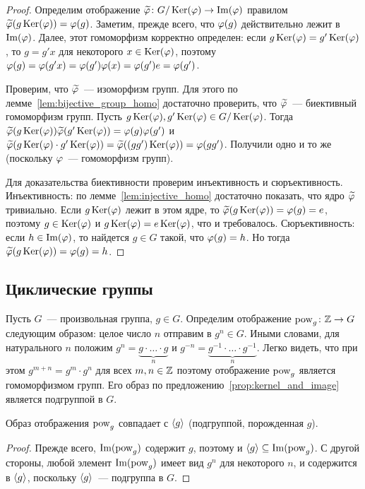 \begin{proof}
Определим отображение $\widetilde{\varphi}\colon G/\operatorname{Ker}(\varphi)\to\operatorname{Im}(\varphi)$
правилом $\widetilde{\varphi}(g\operatorname{Ker}(\varphi)) = \varphi(g)$. Заметим, прежде всего,
что $\varphi(g)$ действительно лежит в $\operatorname{Im}(\varphi)$. Далее, этот
гомоморфизм корректно определен: если $g\operatorname{Ker}(\varphi) = g'\operatorname{Ker}(\varphi)$, то
$g = g'x$ для некоторого $x\in\operatorname{Ker}(\varphi)$, поэтому
$\varphi(g) = \varphi(g'x) = \varphi(g')\varphi(x) = \varphi(g')e = \varphi(g')$.

Проверим, что $\widetilde{\varphi}$~--- изоморфизм групп. Для этого по
лемме~\ref{lem:bijective_group_homo} достаточно проверить, что
$\widetilde{\varphi}$~--- биективный гомоморфизм групп. Пусть
$g\operatorname{Ker}(\varphi), g'\operatorname{Ker}(\varphi)\in G/\operatorname{Ker}(\varphi)$.
Тогда $\widetilde{\varphi}(g\operatorname{Ker}(\varphi))\widetilde{\varphi}(g'\operatorname{Ker}(\varphi)) =
\varphi(g)\varphi(g')$ и $\widetilde{\varphi}(g\operatorname{Ker}(\varphi)\cdot g'\operatorname{Ker}(\varphi)) =
\widetilde{\varphi}((gg')\operatorname{Ker}(\varphi)) = \varphi(gg')$. Получили одно и то же
(поскольку $\varphi$~--- гомоморфизм групп).

Для доказательства биективности проверим инъективность и
сюръективность. Инъективность: по лемме~\ref{lem:injective_homo}
достаточно показать, что ядро $\widetilde{\varphi}$ тривиально. Если
$g\operatorname{Ker}(\varphi)$ лежит в этом ядре, то $\widetilde{\varphi}(g\operatorname{Ker}(\varphi)) = \varphi(g)
= e$, поэтому $g\in\operatorname{Ker}(\varphi)$ и $g\operatorname{Ker}(\varphi) = e\operatorname{Ker}(\varphi)$, что и
требовалось. Сюръективность: если $h\in\operatorname{Im}(\varphi)$, то найдется $g\in
G$ такой, что $\varphi(g) = h$. Но тогда $\widetilde{\varphi}(g\operatorname{Ker}(\varphi)) =
\varphi(g) = h$.
\end{proof}

\subsection{Циклические группы}


Пусть $G$~--- произвольная группа, $g\in G$. Определим отображение
$\operatorname{pow}_g\colon\mathbb Z\to G$ следующим образом: целое число $n$ отправим в
$g^n\in
G$. Иными словами, для натурального $n$ положим
$g^n = \underbrace{g\cdot\dots\cdot g}_n$ и
$g^{-n} = \underbrace{g^{-1}\cdot\dots\cdot g^{-1}}_n$. Легко видеть,
что при этом $g^{m+n} = g^m\cdot g^n$ для всех $m,n\in\mathbb Z$ поэтому
отображение $\operatorname{pow}_g$ является гомоморфизмом групп.
Его образ по предложению~\ref{prop:kernel_and_image} является
подгруппой в $G$.

\begin{lemma}\label{lem:image_power_g}
Образ отображения $\operatorname{pow}_g$ совпадает с $\langle g\rangle$ (подгруппой,
порожденная $g$).
\end{lemma}
\begin{proof}
Прежде всего, $\operatorname{Im}(\operatorname{pow}_g)$ содержит $g$, поэтому и
$\langle g\rangle\subseteq\operatorname{Im}(\operatorname{pow}_g)$. С другой стороны,
любой элемент $\operatorname{Im}(\operatorname{pow}_g)$ имеет вид $g^n$ для некоторого $n$, и
содержится в $\langle g\rangle$, поскольку $\langle g\rangle$~--- подгруппа в $G$.
\end{proof}

